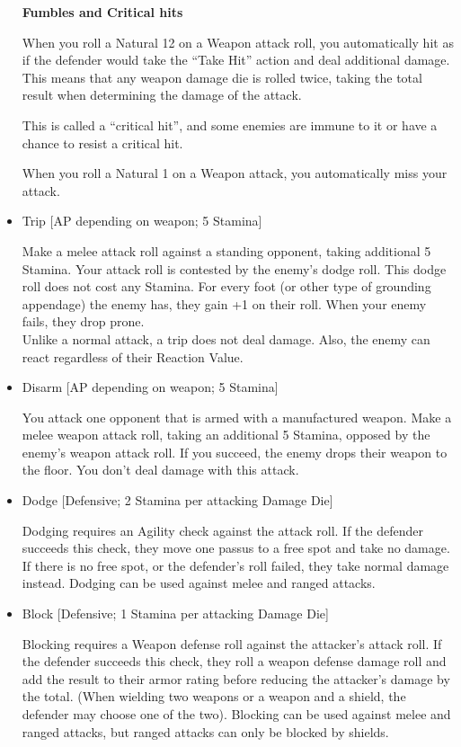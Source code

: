 \begin{itemize}
\textbf{Fumbles and Critical hits}

When you roll a Natural 12 on a Weapon attack roll, you automatically hit as if the defender would take the “Take Hit” action and deal additional damage. This means that any weapon damage die is rolled twice, taking the total result when determining the damage of the attack.

This is called a “critical hit”, and some enemies are immune to it or have a chance to resist a critical hit.

When you roll a Natural 1 on a Weapon attack, you automatically miss your attack.



\item Trip [AP depending on weapon; 5 Stamina]

Make a melee attack roll against a standing opponent, taking additional 5 Stamina. Your attack roll is contested by the enemy's dodge roll. This dodge roll does not cost any Stamina. For every foot (or other type of grounding appendage) the enemy has, they gain +1 on their roll. When your enemy fails, they drop prone.\\
Unlike a normal attack, a trip does not deal damage. Also, the enemy can react regardless of their Reaction Value.\\



\item Disarm [AP depending on weapon; 5 Stamina]

You attack one opponent that is armed with a manufactured weapon. Make a melee weapon attack roll, taking an additional 5 Stamina, opposed by the enemy's weapon attack roll. If you succeed, the enemy drops their weapon to the floor. You don't deal damage with this attack.\\


\item Dodge [Defensive; 2 Stamina per attacking Damage Die]

Dodging requires an Agility check against the attack roll. If the defender succeeds this check, they move one passus to a free spot and take no damage. If there is no free spot, or the defender’s roll failed, they take normal damage instead. Dodging can be used against melee and ranged attacks.



\item Block [Defensive; 1 Stamina per attacking Damage Die]

Blocking requires a Weapon defense roll against the attacker's attack roll. If the defender succeeds this check, they roll a weapon defense damage roll and add the result to their armor rating before reducing the attacker’s damage by the total. (When wielding two weapons or a weapon and a shield, the defender may choose one of the two). Blocking can be used against melee and ranged attacks, but ranged attacks can only be blocked by shields.




\end{itemize}
